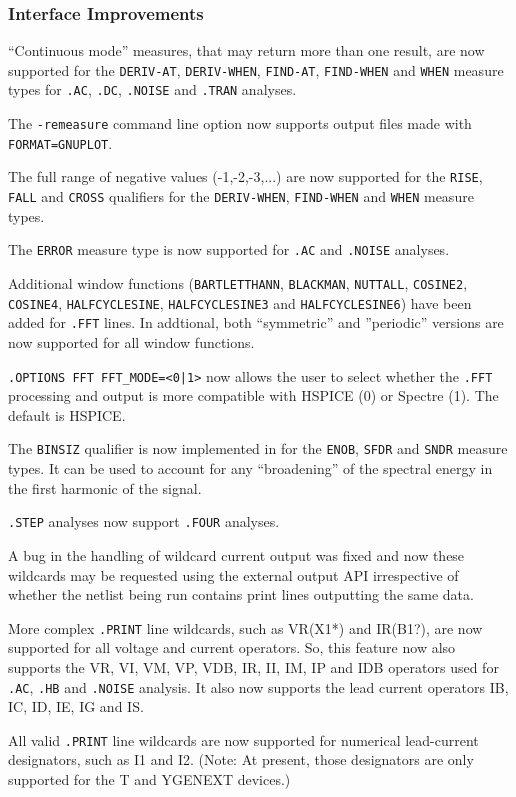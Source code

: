 \documentclass[letterpaper]{scrartcl}
\begin{document}
\subsubsection*{Interface Improvements}
\begin{XyceItemize}
  \item ``Continuous mode'' measures, that may return more than one
    result, are now supported for the \texttt{DERIV-AT},
    \texttt{DERIV-WHEN}, \texttt{FIND-AT}, \texttt{FIND-WHEN} and
    \texttt{WHEN} measure types for \texttt{.AC}, \texttt{.DC},
    \texttt{.NOISE} and \texttt{.TRAN} analyses.
  \item The \texttt{-remeasure} command line option now supports
    \Xyce{} output files made with \texttt{FORMAT=GNUPLOT}.
  \item The full range of negative values (-1,-2,-3,...) are now
    supported for the \texttt{RISE}, \texttt{FALL} and \texttt{CROSS}
    qualifiers for the \texttt{DERIV-WHEN}, \texttt{FIND-WHEN} and
    \texttt{WHEN} measure types.
  \item The \texttt{ERROR} measure type is now supported for
    \texttt{.AC} and \texttt{.NOISE} analyses.
  \item Additional window functions (\texttt{BARTLETTHANN},
    \texttt{BLACKMAN}, \texttt{NUTTALL}, \texttt{COSINE2},
    \texttt{COSINE4}, \texttt{HALFCYCLESINE}, \texttt{HALFCYCLESINE3}
    and \texttt{HALFCYCLESINE6}) have been added for \texttt{.FFT}
    lines.  In addtional, both ``symmetric'' and ''periodic'' versions
    are now supported for all window functions.
  \item \texttt{.OPTIONS FFT FFT\_MODE=<0|1>} now allows the \Xyce{}
    user to select whether the \Xyce{} \texttt{.FFT} processing and
    output is more compatible with HSPICE (0) or Spectre (1).  The
    default is HSPICE.
  \item The \texttt{BINSIZ} qualifier is now implemented in \Xyce{} for
    the \texttt{ENOB}, \texttt{SFDR} and \texttt{SNDR} measure types. It
    can be used to account for any ``broadening'' of the spectral energy
    in the first harmonic of the signal.
  \item \texttt{.STEP} analyses now support \texttt{.FOUR} analyses.
  \item A bug in the handling of wildcard current output was fixed and
    now these wildcards may be requested using the external output API
    irrespective of whether the netlist being run contains print lines
    outputting the same data.
  \item More complex \texttt{.PRINT} line wildcards, such as VR(X1*) and
IR(B1?), are now supported for all voltage and current operators.  So, this
feature now also supports the VR, VI, VM, VP, VDB, IR, II, IM, IP and IDB
operators used for \texttt{.AC}, \texttt{.HB} and \texttt{.NOISE} analysis.
It also now supports the lead current operators IB, IC, ID, IE, IG and IS.
  \item All valid \texttt{.PRINT} line wildcards are now supported for
numerical lead-current designators, such as I1 and I2.  (Note: At present,
those designators are only supported for the T and YGENEXT devices.)

\end{XyceItemize}
\end{document}
